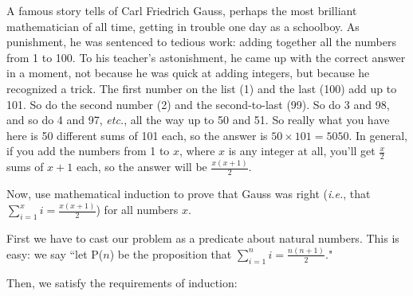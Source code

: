 A famous story tells of Carl Friedrich Gauss, perhaps the most brilliant
mathematician of all time, getting in trouble one day as a schoolboy. As
punishment, he was sentenced to tedious work: adding together all the
numbers from 1 to 100. To his teacher's astonishment, he came up with the
correct answer in a moment, not because he was quick at adding integers,
but because he recognized a trick. The first number on the list (1) and the
last (100) add up to 101. So do the second number (2) and the
second-to-last (99). So do 3 and 98, and so do 4 and 97, \textit{etc.}, all
the way up to 50 and 51. So really what you have here is 50 different sums
of 101 each, so the answer is $50\times 101 = 5050$. In general, if you add
the numbers from 1 to $x$, where $x$ is any integer at all, you'll get
$\frac{x}{2}$ sums of $x+1$ each, so the answer will be $\frac{x(x+1)}{2}$.

Now, use mathematical induction to prove that Gauss was right
(\textit{i.e.}, that $\sum\limits_{i=1}^x{i} = \frac{x(x+1)}{2}$) for all numbers
$x$.

First we have to cast our problem as a predicate about natural numbers.
This is easy: we say ``let P($n$) be the proposition that $\sum\limits_{i=1}^n{i}
= \frac{n(n+1)}{2}$."

Then, we satisfy the requirements of induction:

